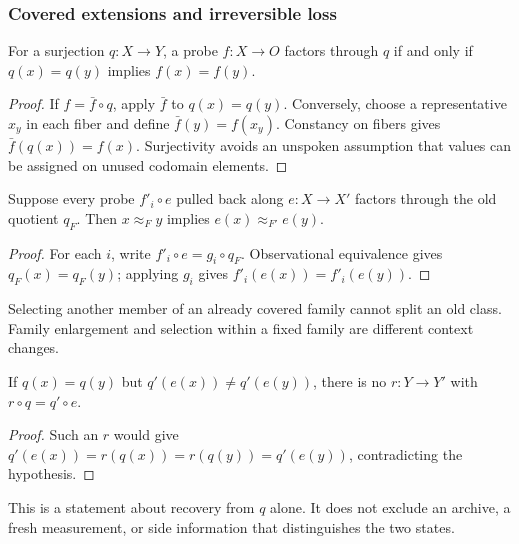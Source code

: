 \subsubsection{Covered extensions and irreversible loss}

\begin{theorem}\label{thm:fiber-constancy}
For a surjection $q:X\to Y$, a probe $f:X\to O$ factors through
$q$ if and only if $q(x)=q(y)$ implies $f(x)=f(y)$.
\end{theorem}
\begin{proof}
If $f=\bar f\circ q$, apply $\bar f$ to $q(x)=q(y)$.
Conversely, choose a representative $x_y$ in each fiber and define
$\bar f(y)=f(x_y)$. Constancy on fibers gives
$\bar f(q(x))=f(x)$. Surjectivity avoids an unspoken assumption
that values can be assigned on unused codomain elements.
\end{proof}

\begin{theorem}\label{thm:covered-extension}
Suppose every probe $f'_i\circ e$ pulled back along $e:X\to X'$
factors through the old quotient $q_F$. Then
$x\approx_F y$ implies $e(x)\approx_{F'}e(y)$.
\end{theorem}
\begin{proof}
For each $i$, write $f'_i\circ e=g_i\circ q_F$.
Observational equivalence gives $q_F(x)=q_F(y)$; applying $g_i$
gives $f'_i(e(x))=f'_i(e(y))$.
\end{proof}
Selecting another member of an already covered family cannot split
an old class. Family enlargement and selection within a fixed family
are different context changes.

\begin{theorem}\label{thm:no-recovery}
If $q(x)=q(y)$ but $q'(e(x))\ne q'(e(y))$, there is no
$r:Y\to Y'$ with $r\circ q=q'\circ e$.
\end{theorem}
\begin{proof}
Such an $r$ would give
$q'(e(x))=r(q(x))=r(q(y))=q'(e(y))$, contradicting the hypothesis.
\end{proof}
This is a statement about recovery from $q$ alone. It does not exclude
an archive, a fresh measurement, or side information that distinguishes
the two states.
